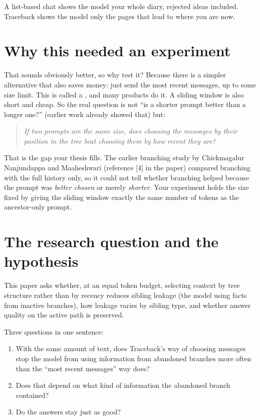 \begin{plain}
A list-based chat shows the model your whole diary, rejected ideas included. Traceback shows the model only the pages that lead to where you are now.
\end{plain}

\section{Why this needed an experiment}

That sounds obviously better, so why test it? Because there is a simpler alternative that also saves money: just send the most recent messages, up to some size limit. This is called a , and many products do it. A sliding window is also short and cheap. So the real question is not ``is a shorter prompt better than a longer one?'' (earlier work already showed that) but:

\begin{quote}
\emph{If two prompts are the same size, does choosing the messages by their position in the tree beat choosing them by how recent they are?}
\end{quote}

That is the gap your thesis fills. The earlier branching study by Chickmagalur Nanjundappa and Maaheshwari (reference [4] in the paper) compared branching with the full history only, so it could not tell whether branching helped because the prompt was \emph{better chosen} or merely \emph{shorter}. Your experiment holds the size fixed by giving the sliding window exactly the same number of tokens as the ancestor-only prompt.

\section{The research question and the hypothesis}

\begin{paper}
This paper asks whether, at an equal token budget, selecting context by tree structure rather than by recency reduces sibling leakage (the model using facts from inactive branches), how leakage varies by sibling type, and whether answer quality on the active path is preserved.
\end{paper}

\begin{plain}
Three questions in one sentence:
\begin{enumerate}
\item With the same amount of text, does Traceback's way of choosing messages stop the model from using information from abandoned branches more often than the ``most recent messages'' way does?
\item Does that depend on what kind of information the abandoned branch contained?
\item Do the answers stay just as good?
\end{enumerate}
\end{plain}

